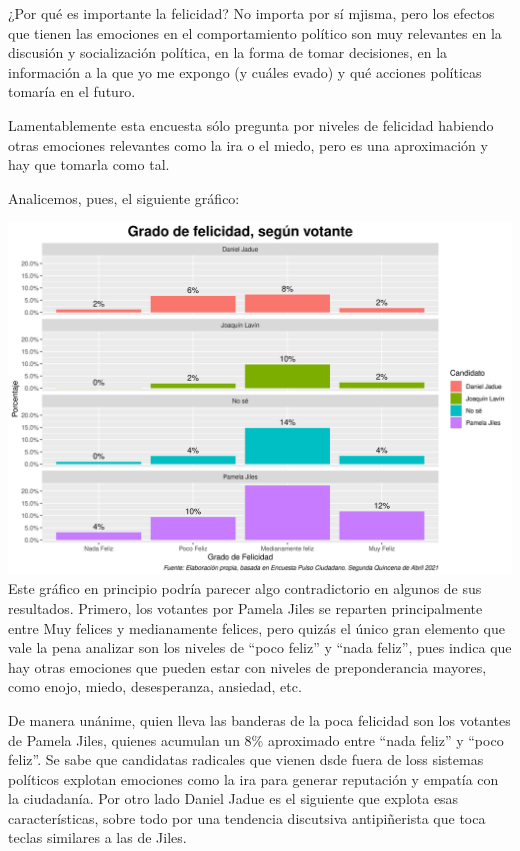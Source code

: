 \documentclass[
]{article}
\begin{document}
¿Por qué es importante la felicidad? No importa por sí mjisma, pero los
efectos que tienen las emociones en el comportamiento político son muy
relevantes en la discusión y socialización política, en la forma de
tomar decisiones, en la información a la que yo me expongo (y cuáles
evado) y qué acciones políticas tomaría en el futuro.

Lamentablemente esta encuesta sólo pregunta por niveles de felicidad
habiendo otras emociones relevantes como la ira o el miedo, pero es una
aproximación y hay que tomarla como tal.

Analicemos, pues, el siguiente gráfico:

\includegraphics{HappyPlot.png} Este gráfico en principio podría parecer
algo contradictorio en algunos de sus resultados. Primero, los votantes
por Pamela Jiles se reparten principalmente entre Muy felices y
medianamente felices, pero quizás el único gran elemento que vale la
pena analizar son los niveles de ``poco feliz'' y ``nada feliz'', pues
indica que hay otras emociones que pueden estar con niveles de
preponderancia mayores, como enojo, miedo, desesperanza, ansiedad, etc.

De manera unánime, quien lleva las banderas de la poca felicidad son los
votantes de Pamela Jiles, quienes acumulan un 8\% aproximado entre
``nada feliz'' y ``poco feliz''. Se sabe que candidatas radicales que
vienen dsde fuera de loss sistemas políticos explotan emociones como la
ira para generar reputación y empatía con la ciudadanía. Por otro lado
Daniel Jadue es el siguiente que explota esas características, sobre
todo por una tendencia discutsiva antipiñerista que toca teclas
similares a las de Jiles.
\end{document}
